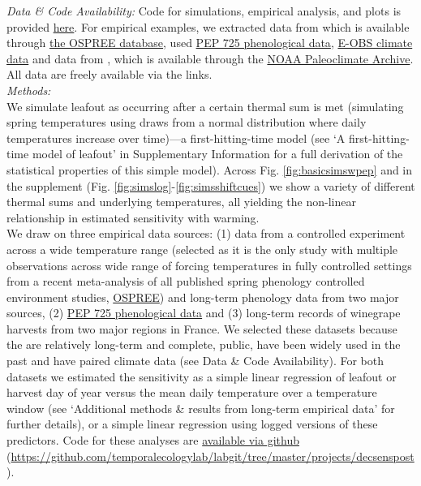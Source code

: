\documentclass[11pt,letter]{article}
\begin{document}
\emph{Data \& Code Availability:} Code for simulations, empirical analysis, and plots is provided \href{https://github.com/temporalecologylab/labgit/tree/master/projects/decsenspost}{here}. For empirical examples, we extracted data from \citet{Charrier:2011aa} which is available through \href{https://knb.ecoinformatics.org}{the OSPREE database}, used \href{http://www.pep725.eu/data.php}{PEP 725 phenological data}, \href{https://surfobs.climate.copernicus.eu/dataaccess/access_eobs.php}{E-OBS climate data} and data from \citet{cookwine2016}, which is available through the \href{https://www.ncdc.noaa.gov/data-access/paleoclimatology-data/datasets}{NOAA Paleoclimate Archive}. All data are freely available via the links.\\

\emph{Methods:} \\ %
We simulate leafout as occurring after a certain thermal sum is met (simulating spring temperatures using draws from a normal distribution where daily temperatures increase over time)---a first-hitting-time model (see `A first-hitting-time model of leafout' in Supplementary Information for a full derivation of the statistical properties of this simple model). Across Fig. \ref{fig:basicsimswpep} and in the supplement (Fig. \ref{fig:simslog}-\ref{fig:simsshiftcues}) we show a variety of different thermal sums and underlying temperatures, all yielding the non-linear relationship in estimated sensitivity with warming. \\

We draw on three empirical data sources: (1) data from a controlled experiment across a wide temperature range \citep{Charrier:2011aa} (selected as it is the only study with multiple observations across wide range of forcing temperatures in fully controlled settings from a recent meta-analysis of all published spring phenology controlled environment studies, \href{https://knb.ecoinformatics.org/view/doi:10.5063/F1QV3JQR}{OSPREE}) and long-term phenology data from two major sources, (2) \href{http://www.pep725.eu/data.php}{PEP 725 phenological data} and (3) long-term records of winegrape harvests from two major regions in France. We selected these datasets because the are relatively long-term and complete, public, have been widely used in the past and have paired climate data (see Data \& Code Availability). For both datasets we estimated the sensitivity as a simple linear regression of leafout or harvest day of year versus the mean daily temperature over a temperature window (see `Additional methods \& results from long-term empirical data' for further details), or a simple linear regression using logged versions of these predictors. Code for these analyses are \href{https://github.com/temporalecologylab/labgit/tree/master/projects/decsenspost}{available via github} (\url{https://github.com/temporalecologylab/labgit/tree/master/projects/decsenspost}).\\
\end{document}
